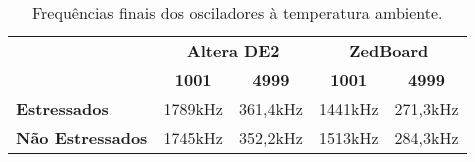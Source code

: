 \begin{table}[H]
\centering
\caption{Frequências finais dos osciladores à temperatura ambiente.}
\begin{tabular}{l|cc|cc|}
\cline{2-5}
 & \multicolumn{2}{c|}{\textbf{Altera DE2}} & \multicolumn{2}{c|}{\textbf{ZedBoard}} \\ \cline{2-5} 
 & \multicolumn{1}{c|}{\textbf{1001}} & \textbf{4999} & \multicolumn{1}{c|}{\textbf{1001}} & \textbf{4999} \\ \hline
\multicolumn{1}{|l|}{\textbf{Estressados}} & \multicolumn{1}{c|}{1789kHz} & 361,4kHz & \multicolumn{1}{c|}{1441kHz} & 271,3kHz \\ \hline
\multicolumn{1}{|l|}{\textbf{Não Estressados}} & \multicolumn{1}{c|}{1745kHz} & 352,2kHz & \multicolumn{1}{c|}{1513kHz} & 284,3kHz \\ \hline
\end{tabular}
\label{tab:FreqFinaisTAmb}
\end{table}